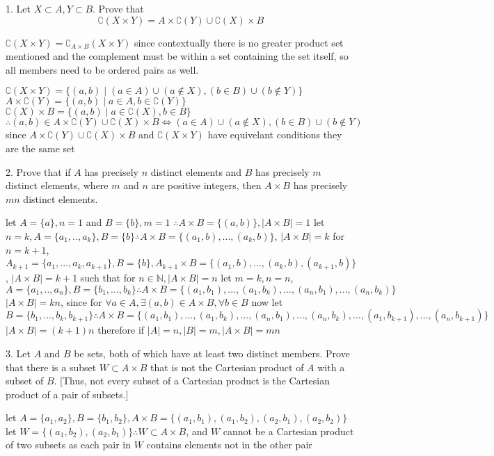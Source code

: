 1. Let $X \subset A, Y \subset B$. Prove that $$\complement (X \times Y) = A \times \complement(Y) \cup \complement(X) \times B$$

$\complement(X \times Y) = \complement_{A\times B}(X \times Y)$ since contextually there is no greater product set mentioned and the complement must be within a set containing the set itself, so all members need to be ordered pairs as well.

$\complement(X \times Y) = \{ (a, b) \mid (a \in A) \cup (a \not\in X), (b \in B) \cup (b \not \in Y) \}$
$A \times \complement(Y) = \{(a, b) \mid a \in  A, b \in \complement(Y)\}$
$\complement(X) \times B = \{ (a, b) \mid a \in \complement(X), b \in B\}$
$\therefore (a, b) \in A \times \complement(Y) \cup \complement(X) \times B \iff (a \in A) \cup (a \not \in X), (b \in B) \cup (b \not \in Y)$
since $A \times \complement(Y) \cup \complement(X) \times B$ and $\complement(X \times Y)$ have equivelant conditions they are the same set

2. Prove that if $A$ has precisely $n$ distinct elements and $B$ has precisely $m$ distinct elements, where $m$ and $n$ are positive integers, then $A \times B$ has precisely $mn$ distinct elements.

let $A = \{a\}, n = 1$ and $B = \{b\}, m = 1$ $\therefore A \times B = \{(a, b)\}, \lvert{A \times B}\rvert = 1$
let $n = k, A = \{ a_{1}, .., a_{k}\}, B = \{b\} \therefore A \times B = \{(a_{1}, b),..., (a_{k}, b) \}$, $\lvert {A \times B}\rvert = k $
for $n = k+1$, $A_{k+1}= \{ a_{1}, ... , a_{k}, a_{k+1}\}, B = \{ b\},A_{k+1} \times B = \{(a_{1}, b), ..., (a_{k}, b), (a_{k+1}, b)\} $, $\lvert A \times B \rvert = k+1$
such that for $n \in \mathbb{N}, \lvert {A \times B}\rvert = n$
let $m = k, n = n$, $A = \{a_{1}, .., a_{n} \}, B = \{b_{1}, ..., b_{k} \} \therefore A \times B = \{ (a_{1}, b_{1}), ..., (a_{1}, b_{k}), ..., (a_{n}, b_{1}), ..., (a_{n}, b_{k})\}$$ \lvert{A \times B}\rvert = kn$, since for $\forall a \in A, \exists (a, b) \in A \times B, \forall b \in B$
now let $B = \{b_{1}, ..., b_{k}, b_{k+1} \} \therefore A \times B = \{(a_{1}, b_{1}), ..., (a_{1}, b_{k}), ..., (a_{n}, b_{1}), ..., (a_{n}, b_{k}), ..., (a_{1}, b_{k+1}), ..., (a_{n}, b_{k+1})\} $$\lvert{A \times B}\rvert = (k+1)n $ therefore if $\lvert{A}\rvert = n, \lvert{B}\rvert = m, \lvert{A \times B}\rvert = mn$

3. Let $A$ and $B$ be sets, both of which have at least two distinct members. Prove that there is a subset $W \subset A \times B$ that is not the Cartesian product of $A$ with a subset of $B$. [Thus, not every subset of a Cartesian product is the Cartesian product of a pair of subsets.]

let $A = \{ a_{1}, a_{2}\}, B = \{ b_{1}, b_{2}\}, A \times B = \{(a_{1}, b_{1}), (a_{1}, b_{2}), (a_{2}, b_{1}), (a_{2}, b_{2})\}$
let $W = \{ (a_{1}, b_{2}), (a_{2}, b_{1})\} \therefore W \subset A \times B$, and $W$ cannot be a Cartesian product of two subsets as each pair in $W$ contains elements not in the other pair




